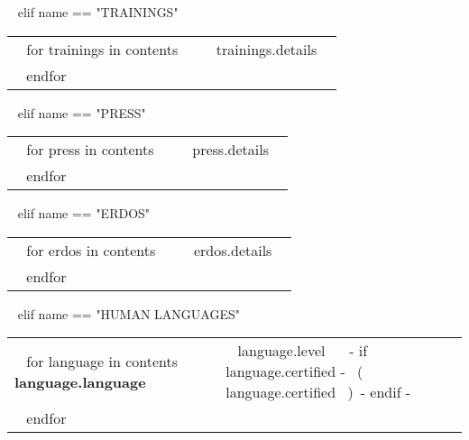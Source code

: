 \begin{minipage}{\textwidth}
~{ elif name == "TRAININGS" }~

\begin{tabular}{ @{} p{} p{} @{} }
  ~{ for trainings in contents }~
  \small \textcolor{gray}{{\emph{ }}} & {\small ~{{ trainings.details }}~} \\
  ~{ endfor }~
\end{tabular}

~{ elif name == "PRESS" }~

\begin{tabular}{ @{} p{} p{} @{} }
  ~{ for press in contents }~
  \small \textcolor{gray}{{\emph{ }}} & {\small ~{{ press.details }}~} \\
  ~{ endfor }~
\end{tabular}


~{ elif name == "ERDOS" }~

\begin{tabular}{ @{} p{} p{} @{} }
  ~{ for erdos in contents }~
  \small \textcolor{gray}{{\emph{ }}} & {\small ~{{ erdos.details }}~} \\
  ~{ endfor }~
\end{tabular}



~{ elif name == "HUMAN LANGUAGES" }~
  \begin{tabular}{ @{} p{32mm} p{135mm} @{} }
  ~{ for language in contents }~
    \bf {~{{ language.language }}~} & {\small ~{{ language.level }}~ ~{- if language.certified -}~ \small\color{maingrey}\hspace{1mm}(~{{ language.certified }}~)~{- endif -}~} \\
  ~{ endfor }~
  \end{tabular}
  \vspace{50mm}


\end{minipage}
